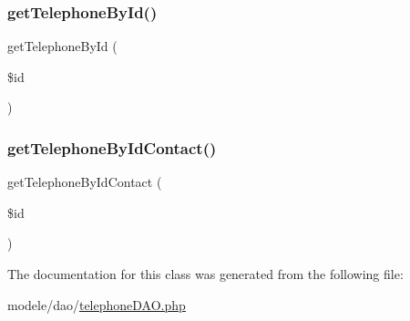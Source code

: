 \mbox{\label{class_telephone_d_a_o_a3be5ef02fb474a86c4cd98fab3209054}} 
\subsubsection{\texorpdfstring{get\+Telephone\+By\+Id()}{getTelephoneById()}}
{\footnotesize\ttfamily get\+Telephone\+By\+Id (\begin{DoxyParamCaption}\item[{}]{\$id }\end{DoxyParamCaption})}

\mbox{\label{class_telephone_d_a_o_a126ab0b580702ce011115963a20a8e80}} 
\subsubsection{\texorpdfstring{get\+Telephone\+By\+Id\+Contact()}{getTelephoneByIdContact()}}
{\footnotesize\ttfamily get\+Telephone\+By\+Id\+Contact (\begin{DoxyParamCaption}\item[{}]{\$id }\end{DoxyParamCaption})}



The documentation for this class was generated from the following file\+:\begin{DoxyCompactItemize}
\item 
modele/dao/\hyperlink{telephone_d_a_o_8php}{telephone\+D\+A\+O.\+php}\end{DoxyCompactItemize}
